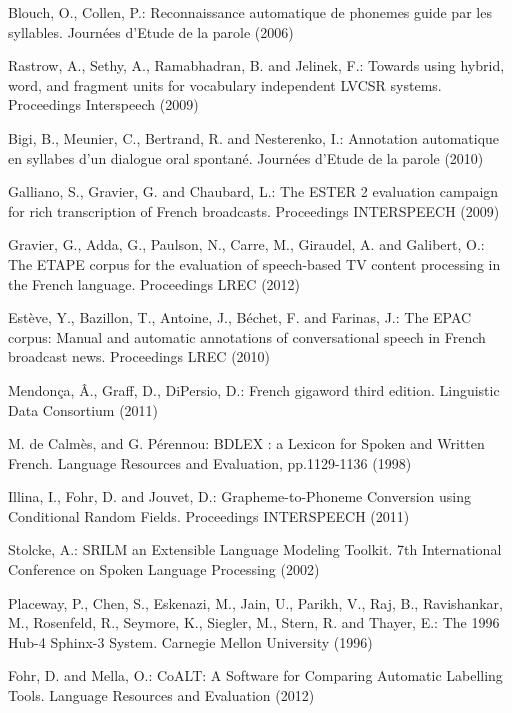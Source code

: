 \documentclass[runningheads,a4paper]{llncs}
\begin{document}
\begin{thebibliography}{1}
Blouch, O., Collen, P.: Reconnaissance automatique de phonemes guide par les syllables. Journées d'Etude de la parole (2006)

Rastrow, A., Sethy, A., Ramabhadran, B. and Jelinek, F.: Towards using hybrid, word, and fragment units for vocabulary independent LVCSR systems. Proceedings Interspeech (2009)

Bigi, B., Meunier, C., Bertrand, R. and Nesterenko, I.: Annotation automatique en syllabes d\textquoteright{}un dialogue oral spontané. Journées d'Etude de la parole (2010)

Galliano, S., Gravier, G. and Chaubard, L.: The ESTER 2 evaluation campaign for rich transcription of French broadcasts. Proceedings INTERSPEECH (2009)

Gravier, G., Adda, G., Paulson, N., Carre, M., Giraudel, A. and Galibert, O.: The ETAPE corpus for the evaluation of speech-based TV content processing in the French language. Proceedings LREC (2012)

Estève, Y., Bazillon, T., Antoine, J., Béchet, F. and Farinas, J.: The EPAC corpus: Manual and automatic annotations of conversational speech in French broadcast news. Proceedings LREC (2010)

Mendonça, Â., Graff, D., DiPersio, D.: French gigaword third edition. Linguistic Data Consortium (2011)

M. de Calmès, and G. Pérennou: BDLEX : a Lexicon for Spoken and Written French. Language Resources and Evaluation, pp.1129-1136 (1998)

Illina, I., Fohr, D. and Jouvet, D.: Grapheme-to-Phoneme Conversion using Conditional Random Fields. Proceedings INTERSPEECH (2011)

Stolcke, A.: SRILM an Extensible Language Modeling Toolkit. 7th International Conference on Spoken Language Processing (2002)

 Placeway, P., Chen, S., Eskenazi, M., Jain, U., Parikh, V., Raj, B., Ravishankar, M., Rosenfeld, R., Seymore, K., Siegler, M., Stern, R. and Thayer, E.: The 1996 Hub-4 Sphinx-3 System. Carnegie Mellon University (1996)

Fohr, D. and Mella, O.: CoALT: A Software for Comparing Automatic Labelling Tools. Language Resources and Evaluation (2012)

\end{thebibliography}
\end{document}
